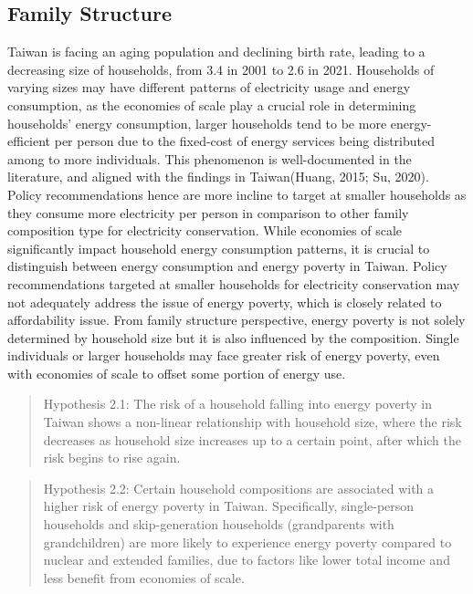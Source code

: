 \documentclass[
  twoside,
  openright,
  degree    = master,               %
  language  = english,              %
  fontset   = overleaf,             %
  watermark = true,                 %
  doi       = true,                 %
]{ntuthesis}
\begin{document}
\hypertarget{family-structure}{%
\subsection{Family Structure}\label{family-structure}}

Taiwan is facing an aging population and declining birth rate, leading
to a decreasing size of households, from 3.4 in 2001 to 2.6 in 2021.
Households of varying sizes may have different patterns of electricity
usage and energy consumption, as the economies of scale play a crucial
role in determining households' energy consumption, larger households
tend to be more energy-efficient per person due to the fixed-cost of
energy services being distributed among to more individuals. This
phenomenon is well-documented in the literature, and aligned with the
findings in Taiwan(Huang, 2015; Su, 2020). Policy recommendations hence
are more incline to target at smaller households as they consume more
electricity per person in comparison to other family composition type
for electricity conservation. While economies of scale significantly
impact household energy consumption patterns, it is crucial to
distinguish between energy consumption and energy poverty in Taiwan.
Policy recommendations targeted at smaller households for electricity
conservation may not adequately address the issue of energy poverty,
which is closely related to affordability issue. From family structure
perspective, energy poverty is not solely determined by household size
but it is also influenced by the composition. Single individuals or
larger households may face greater risk of energy poverty, even with
economies of scale to offset some portion of energy use.

\begin{quote}
Hypothesis 2.1: The risk of a household falling into energy poverty in
Taiwan shows a non-linear relationship with household size, where the
risk decreases as household size increases up to a certain point, after
which the risk begins to rise again.~
\end{quote}

\begin{quote}
Hypothesis 2.2: Certain household compositions are associated with a
higher risk of energy poverty in Taiwan. Specifically, single-person
households and skip-generation households (grandparents with
grandchildren) are more likely to experience energy poverty compared to
nuclear and extended families, due to factors like lower total income
and less benefit from economies of scale.
\end{quote}
\end{document}
